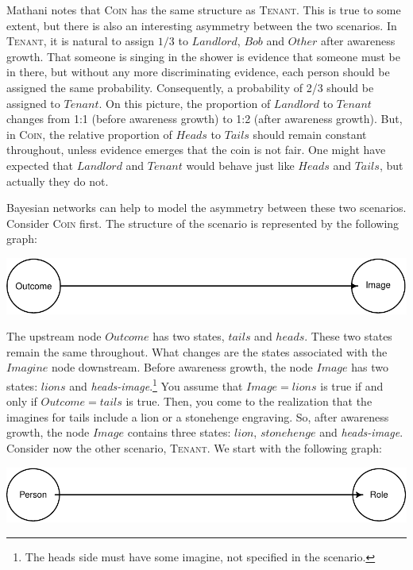 \documentclass[
  11pt,
  dvipsnames,enabledeprecatedfontcommands]{scrartcl}
\begin{document}
Mathani notes that \textsc{Coin} has the same structure as
\textsc{Tenant}. This is true to some extent, but there is also an
interesting asymmetry between the two scenarios. In \textsc{Tenant}, it
is natural to assign \(1/3\) to \(Landlord\), \(Bob\) and \(Other\)
after awareness growth. That someone is singing in the shower is
evidence that someone must be in there, but without any more
discriminating evidence, each person should be assigned the same
probability. Consequently, a probability of 2/3 should be assigned to
\(Tenant\). On this picture, the proportion of \(Landlord\) to
\(Tenant\) changes from 1:1 (before awareness growth) to 1:2 (after
awareness growth). But, in \textsc{Coin}, the relative proportion of
\(Heads\) to \(Tails\) should remain constant throughout, unless
evidence emerges that the coin is not fair. One might have expected that
\(Landlord\) and \(Tenant\) would behave just like \(Heads\) and
\(Tails\), but actually they do not.

Bayesian networks can help to model the asymmetry between these two
scenarios. Consider \textsc{Coin} first. The structure of the scenario
is represented by the following graph:

\begin{center}\includegraphics[width=0.5\linewidth,height=0.3\textheight]{ReplyToSteeleStefansson2_files/figure-latex/tailsDAG-1} \end{center}

\noindent The upstream node \(Outcome\) has two states, \(tails\) and
\(heads\). These two states remain the same throughout. What changes are
the states associated with the \(Imagine\) node downstream. Before
awareness growth, the node \(Image\) has two states: \(lions\) and
\textit{heads-image}.\footnote{The heads side must have some imagine,
  not specified in the scenario.} You assume that \(Image=lions\) is
true if and only if \(Outcome=tails\) is true. Then, you come to the
realization that the imagines for tails include a lion or a stonehenge
engraving. So, after awareness growth, the node \(Image\) contains three
states: \(lion\), \(stonehenge\) and \textit{heads-image}. Consider now
the other scenario, \textsc{Tenant}. We start with the following graph:

\begin{center}\includegraphics[width=0.5\linewidth,height=0.3\textheight]{ReplyToSteeleStefansson2_files/figure-latex/tenantsDAG-1} \end{center}
\end{document}
